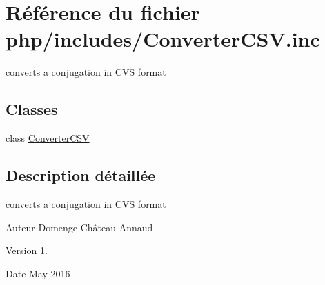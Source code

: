 \hypertarget{ConverterCSV_8inc}{}\section{Référence du fichier php/includes/\+Converter\+C\+SV.inc}
\label{ConverterCSV_8inc}


converts a conjugation in C\+VS format  


\subsection*{Classes}
\begin{DoxyCompactItemize}
\item 
class \hyperlink{classConverterCSV}{Converter\+C\+SV}
\end{DoxyCompactItemize}


\subsection{Description détaillée}
converts a conjugation in C\+VS format 

\begin{DoxyAuthor}{Auteur}
Domenge Château-\/\+Annaud 
\end{DoxyAuthor}
\begin{DoxyVersion}{Version}
1. 
\end{DoxyVersion}
\begin{DoxyDate}{Date}
May 2016 
\end{DoxyDate}
